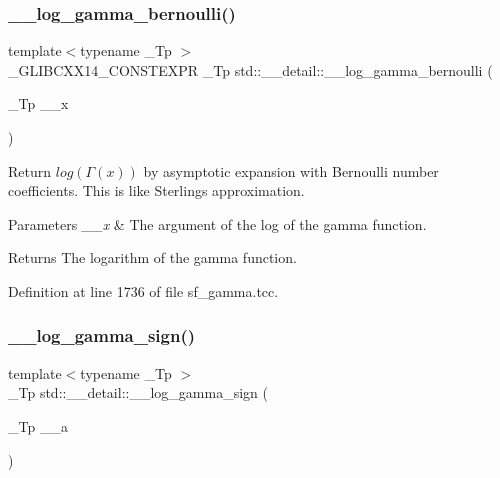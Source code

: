 \subsubsection{\texorpdfstring{\+\_\+\+\_\+log\+\_\+gamma\+\_\+bernoulli()}{\_\_log\_gamma\_bernoulli()}}
{\footnotesize\ttfamily template$<$typename \+\_\+\+Tp $>$ \\
\+\_\+\+G\+L\+I\+B\+C\+X\+X14\+\_\+\+C\+O\+N\+S\+T\+E\+X\+PR \+\_\+\+Tp std\+::\+\_\+\+\_\+detail\+::\+\_\+\+\_\+log\+\_\+gamma\+\_\+bernoulli (\begin{DoxyParamCaption}\item[{\+\_\+\+Tp}]{\+\_\+\+\_\+x }\end{DoxyParamCaption})}



Return $log(\Gamma(x))$ by asymptotic expansion with Bernoulli number coefficients. This is like Sterling\textquotesingle{}s approximation. 


\begin{DoxyParams}{Parameters}
{\em \+\_\+\+\_\+x} & The argument of the log of the gamma function. \\
\hline
\end{DoxyParams}
\begin{DoxyReturn}{Returns}
The logarithm of the gamma function. 
\end{DoxyReturn}


Definition at line 1736 of file sf\+\_\+gamma.\+tcc.

\mbox{\label{namespacestd_1_1____detail_ab17ef141874b20a302d5c142cf304542}} 
\subsubsection{\texorpdfstring{\+\_\+\+\_\+log\+\_\+gamma\+\_\+sign()}{\_\_log\_gamma\_sign()}\hspace{0.1cm}{\footnotesize\ttfamily [1/2]}}
{\footnotesize\ttfamily template$<$typename \+\_\+\+Tp $>$ \\
\+\_\+\+Tp std\+::\+\_\+\+\_\+detail\+::\+\_\+\+\_\+log\+\_\+gamma\+\_\+sign (\begin{DoxyParamCaption}\item[{\+\_\+\+Tp}]{\+\_\+\+\_\+a }\end{DoxyParamCaption})}



